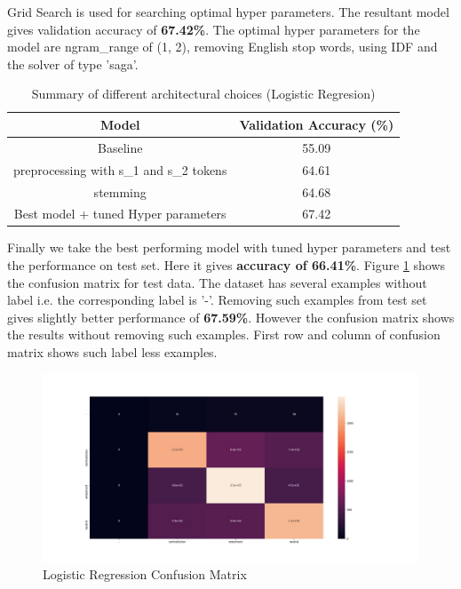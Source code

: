 \documentclass[10pt,a4paper]{article}
\begin{document}
Grid Search is used for searching optimal hyper parameters. The resultant model gives validation accuracy of \textbf{67.42\%}. The optimal hyper parameters for the model are ngram\_range of (1, 2), removing English stop words, using IDF and the solver of type 'saga'.

\begin{table}[h!]
\centering
\begin{tabular}{|c| c|} 
 \hline
 Model & Validation Accuracy (\%) \\
 \hline\hline
 Baseline & 55.09 \\ 
 \hline
 preprocessing with s\_1 and s\_2 tokens & 64.61 \\ 
 \hline
 stemming & 64.68 \\ 
 \hline
 Best model + tuned Hyper parameters & 67.42 \\ 
 \hline
\end{tabular}
\caption{Summary of different architectural choices (Logistic Regresion)}
\label{table:2}
\end{table}

Finally we take the best performing model with tuned hyper parameters and test the performance on test set. Here it gives \textbf{accuracy of 66.41\%}. Figure \ref{mlpcm} shows the confusion matrix for test data. The dataset has several examples without label i.e. the corresponding label is '-'. Removing such examples from test set gives slightly better performance of \textbf{67.59\%}. However the confusion matrix shows the results without removing such examples. First row and column of confusion matrix shows such label less examples.
	
\begin{figure}[h!]
	\includegraphics[width=1.3\linewidth]{cm_lr.jpg}
	\caption{Logistic Regression Confusion Matrix}
	\label{mlpcm}
\end{figure}
\end{document}
